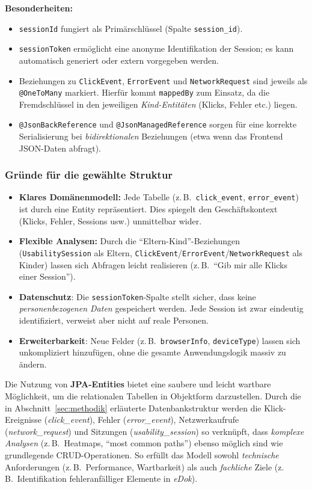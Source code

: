 \documentclass[12pt,oneside]{article}
\begin{document}
\noindent
\textbf{Besonderheiten:}
\begin{itemize}
    \item \lstinline|sessionId| fungiert als Primärschlüssel (Spalte \texttt{session\_id}).
    \item \lstinline|sessionToken| ermöglicht eine anonyme Identifikation der Session; es kann automatisch generiert oder extern vorgegeben werden.
    \item Beziehungen zu \lstinline|ClickEvent|, \lstinline|ErrorEvent| und \lstinline|NetworkRequest| sind jeweils als \lstinline|@OneToMany| markiert. Hierfür kommt \lstinline|mappedBy| zum Einsatz, da die Fremdschlüssel in den jeweiligen \emph{Kind-Entitäten} (Klicks, Fehler etc.) liegen.
    \item \lstinline|@JsonBackReference| und \lstinline|@JsonManagedReference| sorgen für eine korrekte Serialisierung bei \emph{bidirektionalen} Beziehungen (etwa wenn das Frontend JSON-Daten abfragt).
\end{itemize}

\subsubsection{Gründe für die gewählte Struktur}
\begin{itemize}
    \item \textbf{Klares Domänenmodell:} Jede Tabelle (z.\,B.\ \texttt{click\_event}, \texttt{error\_event}) ist durch eine Entity repräsentiert. Dies spiegelt den Geschäftskontext (Klicks, Fehler, Sessions usw.) unmittelbar wider.
    \item \textbf{Flexible Analysen:} Durch die \enquote{Eltern-Kind}-Beziehungen (\lstinline|UsabilitySession| als Eltern, \lstinline|ClickEvent|/\lstinline|ErrorEvent|/\lstinline|NetworkRequest| als Kinder) lassen sich Abfragen leicht realisieren (z.\,B.\ \enquote{Gib mir alle Klicks einer Session}).
    \item \textbf{Datenschutz}: Die \lstinline|sessionToken|-Spalte stellt sicher, dass keine \emph{personenbezogenen Daten} gespeichert werden. Jede Session ist zwar eindeutig identifiziert, verweist aber nicht auf reale Personen.
    \item \textbf{Erweiterbarkeit}: Neue Felder (z.\,B.\ \lstinline|browserInfo|, \lstinline|deviceType|) lassen sich unkompliziert hinzufügen, ohne die gesamte Anwendungslogik massiv zu ändern.
\end{itemize}

 
Die Nutzung von \textbf{JPA-Entities} bietet eine saubere und leicht wartbare Möglichkeit, um die relationalen Tabellen in Objektform darzustellen. Durch die in Abschnitt~\ref{sec:methodik} erläuterte Datenbankstruktur werden die Klick-Ereignisse (\textit{click\_event}), Fehler (\textit{error\_event}), Netzwerkaufrufe (\textit{network\_request}) und Sitzungen (\textit{usability\_session}) so verknüpft, dass \emph{komplexe Analysen} (z.\,B.\ Heatmaps, \enquote{most common paths}) ebenso möglich sind wie grundlegende CRUD-Operationen. So erfüllt das Modell sowohl \emph{technische} Anforderungen (z.\,B.\ Performance, Wartbarkeit) als auch \emph{fachliche} Ziele (z.\,B.\ Identifikation fehleranfälliger Elemente in \textit{eDok}). 
\end{document}
